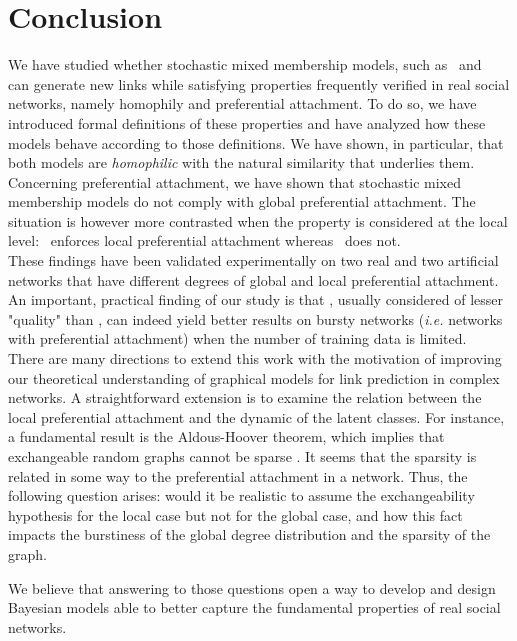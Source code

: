 
\section{Conclusion}
\label{sec:concl}

We have studied whether stochastic mixed membership models, such as \ifm\ and \imb\, can generate new links while satisfying properties frequently verified in real  social networks, namely homophily and preferential attachment. To do so, we have introduced formal definitions of these properties and have analyzed how these models behave according to those definitions. We have shown, in particular, that both models are \textit{homophilic} with the natural similarity that underlies them. Concerning preferential attachment, we have shown that stochastic mixed membership models do not comply with global preferential attachment. The situation is however more contrasted when the property is considered at the local level: \imb\ enforces local preferential attachment whereas \ifm\ does not.~\\

These findings have been validated experimentally on two real and two artificial networks that have different degrees of global and local preferential attachment. An important, practical finding of our study is that \imb, usually considered of lesser "quality" than \ifm, can indeed yield better results on bursty networks (\textit{i.e.} networks with preferential attachment) when the number of training data is limited.~\\

There are many directions to extend this work with the motivation of improving our theoretical understanding of graphical models for link prediction in complex networks. A straightforward extension is to examine the relation between the local preferential attachment and the dynamic of the latent classes.  
For instance, a fundamental result is the Aldous-Hoover theorem, which implies that exchangeable random graphs cannot be sparse \cite{orbanz2015bayesian}. It seems that the sparsity is related in some way to the preferential attachment in a network. Thus, the following question arises: would it be realistic to assume the exchangeability hypothesis for the local case but not for the global case, and how this fact impacts the burstiness of the global degree distribution and the sparsity of the graph.

We believe that answering to those questions open a way to develop and design Bayesian models able to better capture the fundamental properties of  real social networks.
